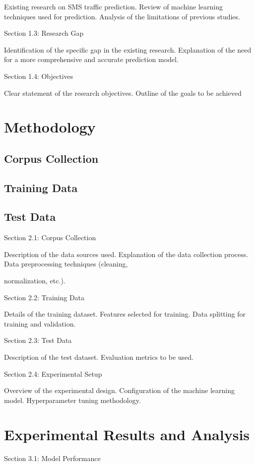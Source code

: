 \documentclass[12pt]{book} %
\begin{document}
    Existing research on SMS traffic prediction.
    Review of machine learning techniques used for prediction.
    Analysis of the limitations of previous studies.

Section 1.3: Research Gap

    Identification of the specific gap in the existing research.
    Explanation of the need for a more comprehensive and accurate prediction model.

Section 1.4: Objectives

    Clear statement of the research objectives.
    Outline of the goals to be achieved


    

\chapter{Methodology}
\section{Corpus Collection}
\section{Training Data}
\section{Test Data}

Section 2.1: Corpus Collection

    Description of the data sources used.
    Explanation of the data collection process.
    Data preprocessing techniques (cleaning,

    normalization, etc.).

Section 2.2: Training Data

    Details of the training dataset.
    Features selected for training.
    Data splitting for training and validation.

Section 2.3: Test Data

    Description of the test dataset.
    Evaluation metrics to be used.

Section 2.4: Experimental Setup

    Overview of the experimental design.
    Configuration of the machine learning model.
    Hyperparameter tuning methodology.


\chapter{Experimental Results and Analysis}
Section 3.1: Model Performance
\end{document}
